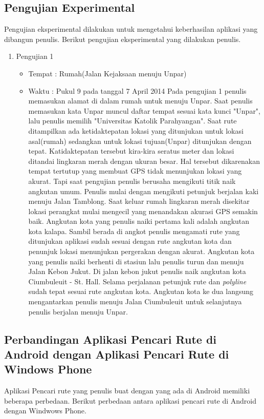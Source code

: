 \subsection{Pengujian Experimental}
\label{lab:Pengujian Experimental}
\hspace{0.5cm} Pengujian eksperimental dilakukan untuk mengetahui keberhasilan aplikasi yang dibangun penulis. Berikut pengujian eksperimental yang dilakukan penulis.
\begin{enumerate}
	\item Pengujian 1
		\begin{itemize}
			\item Tempat : Rumah(Jalan Kejaksaan menuju Unpar)
			\item Waktu : Pukul 9 pada tanggal 7 April 2014
			Pada pengujian 1 penulis memasukan alamat di dalam rumah untuk menuju Unpar. Saat penulis memasukan kata Unpar muncul daftar tempat sesuai kata kunci "Unpar", lalu penulis memilih "Universitas Katolik Parahyangan". Saat rute ditampilkan ada ketidaktepatan lokasi yang ditunjukan untuk lokasi asal(rumah) sedangkan untuk lokasi tujuan(Unpar) ditunjukan dengan tepat. Katidaktepatan tersebut kira-kira seratus meter dan lokasi ditandai lingkaran merah dengan ukuran besar. Hal tersebut dikarenakan tempat tertutup yang membuat GPS tidak menunjukan lokasi yang akurat. Tapi saat pengujian penulis berusaha mengikuti titik naik angkutan umum.
			Penulis mulai dengan mengikuti petunjuk berjalan kaki menuju Jalan Tamblong. Saat keluar rumah lingkaran merah disekitar lokasi perangkat mulai mengecil yang menandakan akurasi GPS semakin baik. Angkutan kota yang penulis naiki pertama kali adalah angkutan kota kalapa. Sambil berada di angkot penulis mengamati rute yang ditunjukan aplikasi sudah sesuai dengan rute angkutan kota dan penunjuk lokasi menunjukan pergerakan dengan akurat. Angkutan kota yang penulis naiki berhenti di stasiun lalu penulis turun dan menuju Jalan Kebon Jukut. Di jalan kebon jukut penulis naik angkutan kota Ciumbuleuit - St. Hall. Selama perjalanan petunjuk rute dan \textit{polyline} sudah tepat sesuai rute angkutan kota. Angkutan kota ke dua langsung mengantarkan penulis menuju Jalan Ciumbuleuit untuk selanjutnya penulis berjalan menuju Unpar.
		\end{itemize}
\end{enumerate}

\subsection{Perbandingan Aplikasi Pencari Rute di Android dengan Aplikasi Pencari Rute di Windows Phone}
\label{lab:Perbandingan}
\hspace{0.5cm} Aplikasi Pencari rute yang penulis buat dengan yang ada di Android memiliki beberapa perbedaan. Berikut perbedaan antara aplikasi pencari rute di Android dengan Windwows Phone.


